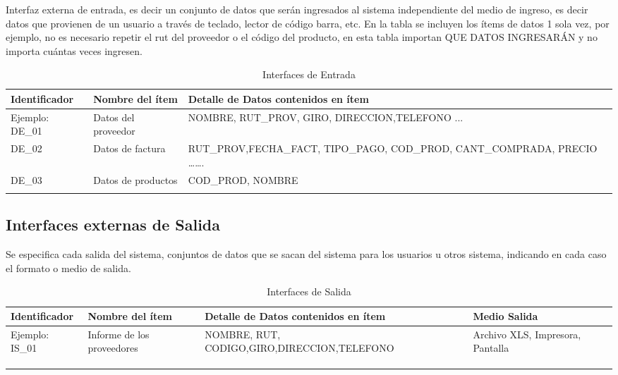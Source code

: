 Interfaz externa de entrada, es decir un conjunto de datos que serán ingresados al sistema independiente del medio de ingreso, es decir datos que provienen de un usuario a través de teclado, lector de código barra, etc.
En la tabla se incluyen los ítems de datos 1 sola vez, por ejemplo, no es necesario repetir el rut del proveedor o el código del producto, en esta tabla importan QUE DATOS INGRESARÁN y no importa cuántas veces ingresen.

 \begin{table}[H]
    \begin{center}
        \begin{tabular}{ | m{2cm} | m{3cm} | m{9cm} |}
            \hline \textbf{Identificador} & \textbf{Nombre del ítem} & \textbf{Detalle de Datos contenidos en ítem} \\ \hline
            Ejemplo: 
            DE\_01 & Datos del proveedor  & NOMBRE, RUT\_PROV, GIRO, DIRECCION,TELEFONO ...\\ \hline
            DE\_02 & Datos de factura & RUT\_PROV,FECHA\_FACT, TIPO\_PAGO, COD\_PROD, CANT\_COMPRADA, PRECIO …….   \\ \hline
            DE\_03 & Datos de productos & COD\_PROD, NOMBRE   \\ \hline
                  &        & \\ \hline
        \end{tabular}
        \caption{Interfaces de Entrada}
    \end{center}
\end{table}

\subsection{Interfaces externas de Salida}

Se especifica cada salida del sistema, conjuntos de datos que se sacan del sistema para los usuarios u otros sistema,  indicando en cada caso el formato o medio de salida. 


 \begin{table}[H]
    \begin{center}
        \begin{tabular}{ | m{2cm} | m{3cm} | m{8cm} | m{2cm} |}
            \hline \textbf{Identificador} & \textbf{Nombre del ítem} & \textbf{Detalle de Datos contenidos en ítem} & \textbf{Medio Salida}\\ \hline
            Ejemplo: 
            IS\_01 & Informe de los proveedores  & NOMBRE, RUT, CODIGO,GIRO,DIRECCION,TELEFONO & Archivo XLS, Impresora, Pantalla\\ \hline
             &  &  & \\ \hline
             &  &  & \\ \hline
             &  &  & \\ \hline
        \end{tabular}
        \caption{Interfaces de Salida}
    \end{center}
\end{table}


